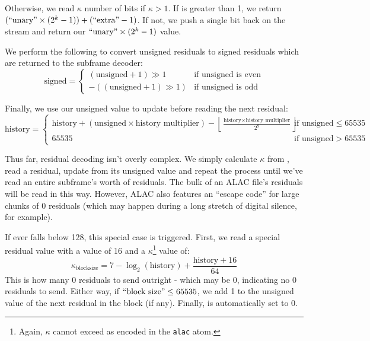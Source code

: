 Otherwise, we read $\kappa$ number of  bits if $\kappa > 1$.
If  is greater than 1, we return
$(\text{``{unary}''} \times (2^k - 1)) + (\text{``{extra}''} - 1)$.
If not, we push a single  bit back on the stream and return our
$\text{``{unary}''} \times (2^k - 1)$ value.

\clearpage

We perform the following to convert unsigned residuals to signed residuals
which are returned to the subframe decoder:
\begin{equation}
\text{signed} =
\begin{cases}
(\text{unsigned} + 1) \gg 1 & \text{if unsigned is even} \\
-((\text{unsigned} + 1) \gg 1) & \text{if unsigned is odd}
\end{cases}
\end{equation}

Finally, we use our unsigned value to update 
before reading the next residual:
{
\begin{equation*}
\text{history} =
\begin{cases}
\text{history} + (\text{unsigned} \times \text{history multiplier}) - \left\lfloor\frac{\text{history} \times \text{history multiplier}}{2^9}\right\rfloor & \text{if unsigned} \leq 65535 \\
65535 & \text{if unsigned} > 65535
\end{cases}
\end{equation*}
}

Thus far, residual decoding isn't overly complex.
We simply calculate $\kappa$ from , read a residual,
update  from its unsigned value and repeat the process
until we've read an entire subframe's worth of residuals.
The bulk of an ALAC file's residuals will be read in this way.
However, ALAC also features an ``escape code'' for large chunks
of 0 residuals (which may happen during a long stretch of
digital silence, for example).

If  ever falls below 128, this special case is triggered.
First, we read a special  residual value
with a  value of 16 and a $\kappa$\footnote{Again, $\kappa$ cannot exceed  as encoded in the \texttt{alac} atom.} value of:
\begin{equation}
\kappa_{\text{blocksize}} = 7 - \log_2(\text{history}) + \frac{\text{history} + 16}{64}
\end{equation}
This  is how many 0 residuals to send outright -
which may be 0, indicating no 0 residuals to send.
Either way, if $\text{``{block size}''} \leq 65535$,
we add 1 to the unsigned value of the next residual in the block (if any).
Finally,  is automatically set to 0.

